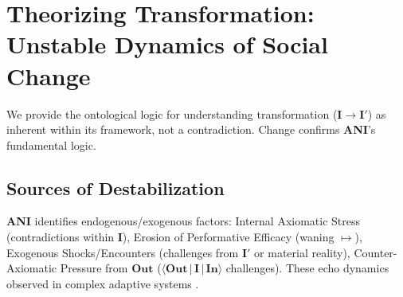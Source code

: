 \documentclass{article}
\newcommand{\ANI}{\textbf{ANI}}             %
\newcommand{\Isness}{\mathbf{I}}            %
\newcommand{\Inness}{\mathbf{In}}           %
\newcommand{\Outness}{\mathbf{Out}}         %
\newcommand{\enactment}{\ensuremath{\mapsto}} %
\newcommand{\orientation}[3]{\ensuremath{\langle #1 \,|\, #2 \,|\, #3 \rangle}} %
\begin{document}
\begin{figure}[h!]
    \label{fig:axiomatic_convergence_grids} %
\end{figure}

\section{Theorizing Transformation: Unstable Dynamics of Social Change}

We provide the ontological logic for understanding transformation ($\Isness \rightarrow \Isness'$) as inherent within its framework, not a contradiction. Change confirms \ANI{}'s fundamental logic.

\subsection{Sources of Destabilization}

\ANI{} identifies endogenous/exogenous factors: Internal Axiomatic Stress (contradictions within $\Isness$), Erosion of Performative Efficacy (waning $\enactment$), Exogenous Shocks/Encounters (challenges from $\Isness'$ or material reality), Counter-Axiomatic Pressure from $\Outness$ ($\orientation{\Outness}{\Isness}{\Inness}$ challenges). These echo dynamics observed in complex adaptive systems \citep{Prigogine1984, Bateson1972}.
\end{document}
